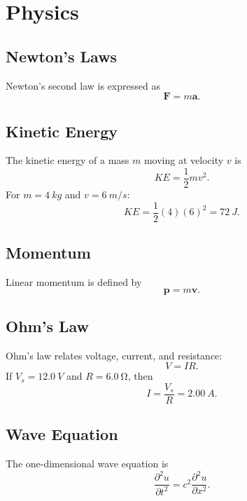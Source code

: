 \documentclass[11pt]{article}
\begin{document}
\newpage

\section{Physics}
\subsection{Newton's Laws}
Newton's second law is expressed as
\begin{equation}
    \mathbf{F} = m\mathbf{a}.
\end{equation}

\subsection{Kinetic Energy}
The kinetic energy of a mass $m$ moving at velocity $v$ is
\begin{equation}
    KE = \frac{1}{2} m v^2.
\end{equation}
For $m = \SI{4}{kg}$ and $v = \SI{6}{m/s}$:
\begin{equation}
    KE = \frac{1}{2} (4)(6)^2 = \SI{72}{J}.
\end{equation}

\subsection{Momentum}
Linear momentum is defined by
\begin{equation}
    \mathbf{p} = m \mathbf{v}.
\end{equation}

\subsection{Ohm's Law}
Ohm's law relates voltage, current, and resistance:
\begin{equation}
    V = IR.
\end{equation}
If $V_s = \SI{12.0}{V}$ and $R = \SI{6.0}{\ohm}$, then
\begin{equation}
    I = \frac{V_s}{R} = \SI{2.00}{A}.
\end{equation}

\subsection{Wave Equation}
The one-dimensional wave equation is
\begin{equation}
    \frac{\partial^2 u}{\partial t^2} = c^2 \frac{\partial^2 u}{\partial x^2}.
\end{equation}
\end{document}
